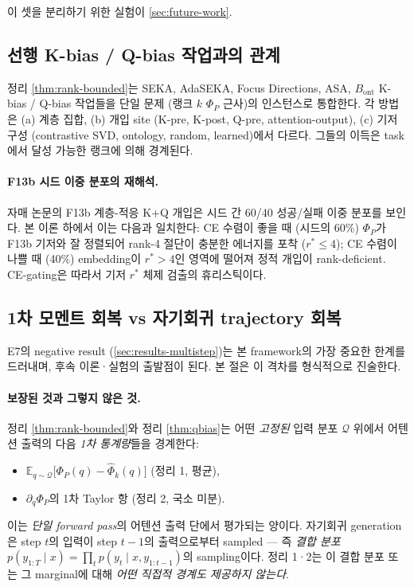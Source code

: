 \documentclass{article}
\theoremstyle{definition}
\newcommand{\E}{\mathbb{E}}
\newcommand{\Phip}{\Phi_P}
\begin{document}
이 셋을 분리하기 위한 실험이 \cref{sec:future-work}.

\subsection{선행 K-bias / Q-bias 작업과의 관계}
\label{sec:related-detail}

정리 \ref{thm:rank-bounded}는 SEKA, AdaSEKA, Focus Directions, ASA, $B_{\mathrm{ont}}$ K-bias / Q-bias 작업들을 단일 문제 (랭크 $k$ $\Phip$ 근사)의 인스턴스로 통합한다. 각 방법은 (a) 계층 집합, (b) 개입 site (K-pre, K-post, Q-pre, attention-output), (c) 기저 구성 (contrastive SVD, ontology, random, learned)에서 다르다. 그들의 이득은 task에서 달성 가능한 랭크에 의해 경계된다.

\paragraph{F13b 시드 이중 분포의 재해석.}
자매 논문의 F13b 계층-적응 K+Q 개입은 시드 간 60/40 성공/실패 이중 분포를 보인다. 본 이론 하에서 이는 다음과 일치한다: CE 수렴이 좋을 때 (시드의 60\%) $\Phip$가 F13b 기저와 잘 정렬되어 rank-4 절단이 충분한 에너지를 포착 ($r^*\le 4$); CE 수렴이 나쁠 때 (40\%) embedding이 $r^* > 4$인 영역에 떨어져 정적 개입이 rank-deficient. CE-gating은 따라서 기저 $r^*$ 체제 검출의 휴리스틱이다.

\subsection{1차 모멘트 회복 vs 자기회귀 trajectory 회복}
\label{sec:trajectory-vs-firstmoment}

E7의 negative result (\cref{sec:results-multistep})는 본 framework의 가장 중요한 한계를 드러내며, 후속 이론·실험의 출발점이 된다. 본 절은 이 격차를 형식적으로 진술한다.

\paragraph{보장된 것과 그렇지 않은 것.}
정리 \ref{thm:rank-bounded}와 정리 \ref{thm:qbias}는 어떤 \emph{고정된} 입력 분포 $\mathcal{Q}$ 위에서 어텐션 출력의 다음 \emph{1차 통계량}들을 경계한다:
\begin{itemize}[leftmargin=*]
\item $\E_{q\sim\mathcal{Q}}\bigl[\Phip(q) - \hat\Phi_k(q)\bigr]$ (정리 1, 평균),
\item $\partial_q \Phip$의 1차 Taylor 항 (정리 2, 국소 미분).
\end{itemize}
이는 \emph{단일 forward pass}의 어텐션 출력 단에서 평가되는 양이다. 자기회귀 generation은 step $t$의 입력이 step $t-1$의 출력으로부터 sampled — 즉 \emph{결합 분포} $p(y_{1:T} \mid x) = \prod_t p(y_t \mid x, y_{1:t-1})$의 sampling이다. 정리 1·2는 이 결합 분포 또는 그 marginal에 대해 \emph{어떤 직접적 경계도 제공하지 않는다}.
\end{document}
